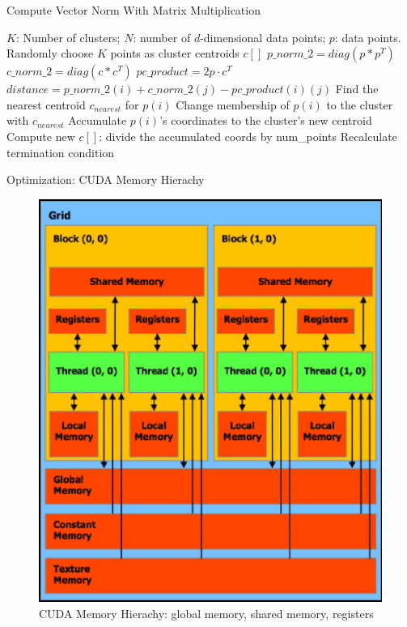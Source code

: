 \documentclass[
nopagebreaks,
style=klope,
fleqn]{powerdot}
\begin{document}
\begin{slide}{Compute Vector Norm With Matrix Multiplication}
  \footnotesize
  \begin{algorithmic}[1]
    \INPUT $K$: Number of clusters; $N$: number of $d$-dimensional data points; $p$: data points.
     \label{alg:pm2}
    \State Randomly choose $K$ points as cluster centroids $c[]$
    \State $p\_norm\_2 = diag(p * p^T)$
    \State $c\_norm\_2 = diag(c * c^T)$
    \State $pc\_product = 2 p \cdot c^T$
    \State $distance = p\_norm\_2(i) + c\_norm\_2(j) - pc\_product(i)(j)$
    \EndFor
    \State Find the nearest centroid $c_{nearest}$ for $p(i)$
    \State Change membership of $p(i)$ to the cluster with $c_{nearest}$
    \State Accumulate $p(i)$'s coordinates to the cluster's new centroid
    \EndParFor
    \State Compute new $c[]$: divide the accumulated coords by num\_points
    \State Recalculate termination condition
    \EndWhile
    \EndFunction
  \end{algorithmic}
\end{slide}

\begin{slide}{Optimization: CUDA Memory Hierachy}
  \begin{figure}[!h]
  \centering
  \includegraphics[height=0.6\textheight]{fig/cuda_memory}
  \caption{CUDA Memory Hierachy: global memory, shared memory, registers}
  \label{fig:cuda_memory}
  \end{figure}

\end{slide}
\end{document}
